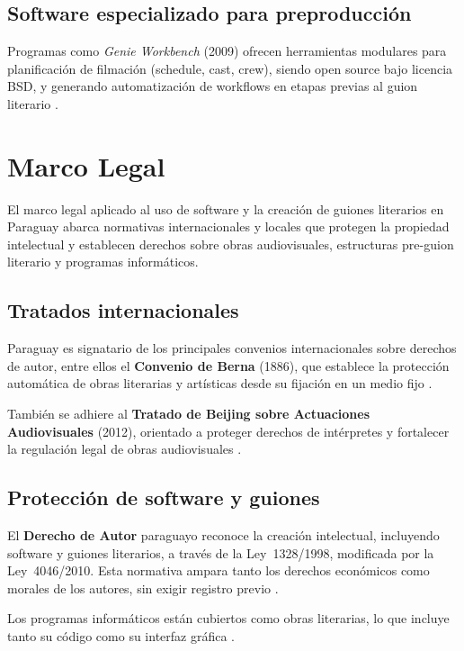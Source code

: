 \documentclass[12pt]{article}
\begin{document}
	\subsection{Software especializado para preproducción}
	Programas como \textit{Genie Workbench} (2009) ofrecen herramientas modulares para planificación de filmación (schedule, cast, crew), siendo open source bajo licencia BSD, y generando automatización de workflows en etapas previas al guion literario \parencite{turn0search26GenieWorkbench}.

	\section{Marco Legal}

	El marco legal aplicado al uso de software y la creación de guiones literarios en Paraguay abarca normativas internacionales y locales que protegen la propiedad intelectual y establecen derechos sobre obras audiovisuales, estructuras pre-guion literario y programas informáticos.

	\subsection{Tratados internacionales}

	Paraguay es signatario de los principales convenios internacionales sobre derechos de autor, entre ellos el \textbf{Convenio de Berna} (1886), que establece la protección automática de obras literarias y artísticas desde su fijación en un medio fijo \parencite{berne2025,rule_shorter_term}.

	También se adhiere al \textbf{Tratado de Beijing sobre Actuaciones Audiovisuales} (2012), orientado a proteger derechos de intérpretes y fortalecer la regulación legal de obras audiovisuales \parencite{beijing_treaty2025}.

	\subsection{Protección de software y guiones}

	{\sloppy
		El \textbf{Derecho de Autor} paraguayo reconoce la creación intelectual, incluyendo software y guiones literarios, a través de la Ley 1328/1998, modificada por la Ley 4046/2010. Esta normativa ampara tanto los derechos económicos como morales de los autores, sin exigir registro previo \parencite{wipo_paraguay}.
	}

	Los programas informáticos están cubiertos como obras literarias, lo que incluye tanto su código como su interfaz gráfica \parencite{njq_paraguay,paraguay_software1998}.
\end{document}

